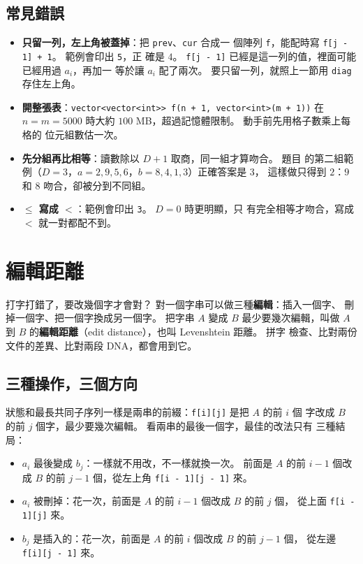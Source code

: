 \subsection{常見錯誤}

\begin{itemize}
\item \textbf{只留一列，左上角被蓋掉}：把 \texttt{prev}、\texttt{cur} 合成一
個陣列 \texttt{f}，能配時寫 \texttt{f[j - 1] + 1}。 範例會印出 \texttt{5}，正
確是 $4$。 \texttt{f[j - 1]} 已經是這一列的值，裡面可能已經用過 $a_i$，再加一
等於讓 $a_i$ 配了兩次。 要只留一列，就照上一節用 \texttt{diag} 存住左上角。
\item \textbf{開整張表}：\texttt{vector<vector<int>> f(n + 1, vector<int>(m + 1))}
在 $n = m = 5000$ 時大約 $100$ MB，超過記憶體限制。 動手前先用格子數乘上每格的
位元組數估一次。
\item \textbf{先分組再比相等}：讀數除以 $D + 1$ 取商，同一組才算吻合。 題目
的第二組範例（$D = 3$，$a = 2, 9, 5, 6$，$b = 8, 4, 1, 3$）正確答案是 $3$，
這樣做只得到 $2$：$9$ 和 $8$ 吻合，卻被分到不同組。
\item \textbf{$\le$ 寫成 $<$}：範例會印出 \texttt{3}。 $D = 0$ 時更明顯，只
有完全相等才吻合，寫成 $<$ 就一對都配不到。
\end{itemize}

\section{編輯距離}
\label{sec:ss-edit}

打字打錯了，要改幾個字才會對？ 對一個字串可以做三種\textbf{編輯}：插入一個字、
刪掉一個字、把一個字換成另一個字。 把字串 $A$ 變成 $B$ 最少要幾次編輯，叫做
$A$ 到 $B$ 的\textbf{編輯距離}（edit distance），也叫 Levenshtein 距離。 拼字
檢查、比對兩份文件的差異、比對兩段 DNA，都會用到它。

\subsection{三種操作，三個方向}
\label{sec:ss-edit-table}

狀態和最長共同子序列一樣是兩串的前綴：\texttt{f[i][j]} 是把 $A$ 的前 $i$ 個
字改成 $B$ 的前 $j$ 個字，最少要幾次編輯。 看兩串的最後一個字，最佳的改法只有
三種結局：

\begin{itemize}
\item $a_i$ 最後變成 $b_j$：一樣就不用改，不一樣就換一次。 前面是 $A$ 的前
$i - 1$ 個改成 $B$ 的前 $j - 1$ 個，從左上角 \texttt{f[i - 1][j - 1]} 來。
\item $a_i$ 被刪掉：花一次，前面是 $A$ 的前 $i - 1$ 個改成 $B$ 的前 $j$ 個，
從上面 \texttt{f[i - 1][j]} 來。
\item $b_j$ 是插入的：花一次，前面是 $A$ 的前 $i$ 個改成 $B$ 的前 $j - 1$ 個，
從左邊 \texttt{f[i][j - 1]} 來。
\end{itemize}

